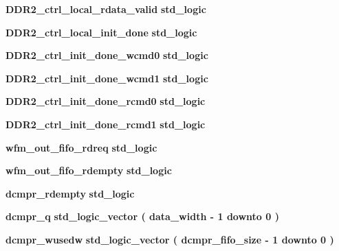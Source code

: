 \begin{DoxyCompactItemize}
\item 
{\bf D\+D\+R2\+\_\+ctrl\+\_\+local\+\_\+rdata\+\_\+valid} {\bfseries \textcolor{comment}{std\+\_\+logic}\textcolor{vhdlchar}{ }} 
\item 
{\bf D\+D\+R2\+\_\+ctrl\+\_\+local\+\_\+init\+\_\+done} {\bfseries \textcolor{comment}{std\+\_\+logic}\textcolor{vhdlchar}{ }} 
\item 
{\bf D\+D\+R2\+\_\+ctrl\+\_\+init\+\_\+done\+\_\+wcmd0} {\bfseries \textcolor{comment}{std\+\_\+logic}\textcolor{vhdlchar}{ }} 
\item 
{\bf D\+D\+R2\+\_\+ctrl\+\_\+init\+\_\+done\+\_\+wcmd1} {\bfseries \textcolor{comment}{std\+\_\+logic}\textcolor{vhdlchar}{ }} 
\item 
{\bf D\+D\+R2\+\_\+ctrl\+\_\+init\+\_\+done\+\_\+rcmd0} {\bfseries \textcolor{comment}{std\+\_\+logic}\textcolor{vhdlchar}{ }} 
\item 
{\bf D\+D\+R2\+\_\+ctrl\+\_\+init\+\_\+done\+\_\+rcmd1} {\bfseries \textcolor{comment}{std\+\_\+logic}\textcolor{vhdlchar}{ }} 
\item 
{\bf wfm\+\_\+out\+\_\+fifo\+\_\+rdreq} {\bfseries \textcolor{comment}{std\+\_\+logic}\textcolor{vhdlchar}{ }} 
\item 
{\bf wfm\+\_\+out\+\_\+fifo\+\_\+rdempty} {\bfseries \textcolor{comment}{std\+\_\+logic}\textcolor{vhdlchar}{ }} 
\item 
{\bf dcmpr\+\_\+rdempty} {\bfseries \textcolor{comment}{std\+\_\+logic}\textcolor{vhdlchar}{ }} 
\item 
{\bf dcmpr\+\_\+q} {\bfseries \textcolor{comment}{std\+\_\+logic\+\_\+vector}\textcolor{vhdlchar}{ }\textcolor{vhdlchar}{(}\textcolor{vhdlchar}{ }\textcolor{vhdlchar}{ }\textcolor{vhdlchar}{ }\textcolor{vhdlchar}{ }{\bfseries {\bf data\+\_\+width}} \textcolor{vhdlchar}{-\/}\textcolor{vhdlchar}{ } \textcolor{vhdldigit}{1} \textcolor{vhdlchar}{ }\textcolor{keywordflow}{downto}\textcolor{vhdlchar}{ }\textcolor{vhdlchar}{ } \textcolor{vhdldigit}{0} \textcolor{vhdlchar}{ }\textcolor{vhdlchar}{)}\textcolor{vhdlchar}{ }} 
\item 
{\bf dcmpr\+\_\+wusedw} {\bfseries \textcolor{comment}{std\+\_\+logic\+\_\+vector}\textcolor{vhdlchar}{ }\textcolor{vhdlchar}{(}\textcolor{vhdlchar}{ }\textcolor{vhdlchar}{ }\textcolor{vhdlchar}{ }\textcolor{vhdlchar}{ }{\bfseries {\bf dcmpr\+\_\+fifo\+\_\+size}} \textcolor{vhdlchar}{-\/}\textcolor{vhdlchar}{ } \textcolor{vhdldigit}{1} \textcolor{vhdlchar}{ }\textcolor{keywordflow}{downto}\textcolor{vhdlchar}{ }\textcolor{vhdlchar}{ } \textcolor{vhdldigit}{0} \textcolor{vhdlchar}{ }\textcolor{vhdlchar}{)}\textcolor{vhdlchar}{ }} 

\end{DoxyCompactItemize}
